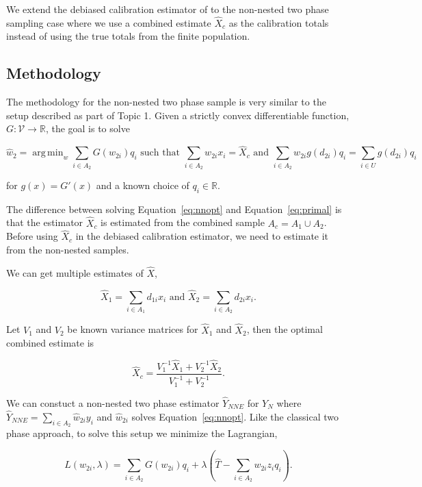 \documentclass[12pt]{article}
\DeclareMathOperator*{\argmin}{arg\,min}
\begin{document}
We extend the debiased calibration estimator of \cite{kwon2024debiased} to the
non-nested two phase sampling case where we use a combined estimate $\hat X_c$
as the calibration totals instead of using the true totals from the finite
population.

\subsection{Methodology}

The methodology for the non-nested two phase sample is very similar to the setup
described as part of Topic 1. Given a strictly convex differentiable function,
$G: \mathcal{V} \to \mathbb{R}$, the goal is to solve

\begin{equation}\label{eq:nnopt}
\hat w_2 = \argmin_w \sum_{i \in A_2} G(w_{2i}) q_i \text{ such that } 
\sum_{i \in A_2} w_{2i} x_i = \hat X_{c} \text{ and } 
\sum_{i \in A_2} w_{2i} g(d_{2i}) q_i = \sum_{i \in U} g(d_{2i}) q_i
\end{equation}

for $g(x) = G'(x)$ and a known choice of $q_i \in \mathbb{R}$. 

The difference
between solving Equation~\ref{eq:nnopt} and Equation~\ref{eq:primal} is that the
estimator $\hat X_{c}$ is estimated from the combined sample $A_c= A_1 \cup
A_2$. Before using
$\hat X_{c}$ in the debiased calibration estimator, we need to estimate it
from the non-nested samples.

We can get multiple estimates of $\hat X$, 

$$\hat X_1 = \sum_{i \in A_1} d_{1i} x_i \text{ and }
\hat X_2 = \sum_{i \in A_2} d_{2i} x_i.$$

Let $V_1$ and $V_2$ be known variance matrices for $\hat X_1$ and $\hat X_2$,
then the optimal combined estimate is 

$$\hat X_c = \frac{V_1^{-1} \hat X_1 + V_2^{-1} \hat X_2}{V_1^{-1} + V_2^{-1}}.$$

We can constuct a non-nested two phase estimator $\hat Y_{NNE}$ for $Y_N$ where
$\hat Y_{NNE} = \sum_{i \in A_2} \hat w_{2i} y_i$ and $\hat w_{2i}$ solves
Equation~\ref{eq:nnopt}. Like the classical two phase approach, to solve this
setup we minimize the Lagrangian,

\begin{equation}\label{eq:legragedc2}
  L(w_{2i}, \lambda) = \sum_{i \in A_2} G(w_{2i}) q_i + \lambda 
  \left( \hat T - \sum_{i \in A_2} w_{2i} z_i q_i\right).
\end{equation}
\end{document}
